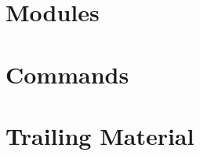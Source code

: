 \documentclass[11pt,a4paper,twoside]{report}
\begin{document}
\part{\mad Modules}                      


\part{\ptc Commands}


\part{Trailing Material}





\printindex

%
%
%
%
%
%
%
%

\end{document}
